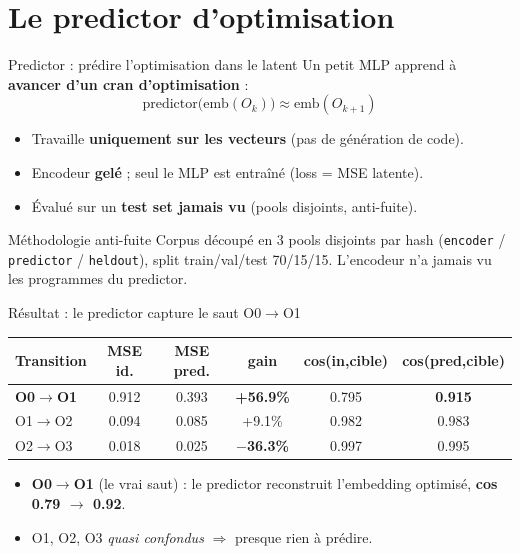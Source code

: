 \documentclass[aspectratio=169,11pt]{beamer}
\newcommand{\hl}[1]{\textcolor{jblue}{\textbf{#1}}}
\newcommand{\good}[1]{\textcolor{jgreen}{\textbf{#1}}}
\newcommand{\bad}[1]{\textcolor{jred}{\textbf{#1}}}
\begin{document}
\section{Le predictor d'optimisation}
\begin{frame}{Predictor : prédire l'optimisation dans le latent}
  Un petit MLP apprend à \hl{avancer d'un cran d'optimisation} :
  \[ \text{predictor}\big(\text{emb}(O_k)\big) \approx \text{emb}(O_{k+1}) \]
  \begin{itemize}
    \item Travaille \textbf{uniquement sur les vecteurs} (pas de génération de code).
    \item Encodeur \textbf{gelé} ; seul le MLP est entraîné (loss = MSE latente).
    \item Évalué sur un \hl{test set jamais vu} (pools disjoints, anti-fuite).
  \end{itemize}
  \vspace{2mm}
  \begin{block}{Méthodologie anti-fuite}
    \footnotesize Corpus découpé en 3 pools disjoints par hash
    (\texttt{encoder} / \texttt{predictor} / \texttt{heldout}), split
    train/val/test 70/15/15. L'encodeur n'a jamais vu les programmes du predictor.
  \end{block}
\end{frame}

\begin{frame}{Résultat : le predictor capture le saut O0$\to$O1}
  \centering
  \small
  \begin{tabular}{lccccc}
    \toprule
    Transition & MSE id. & MSE pred. & gain & cos(in,cible) & cos(pred,cible) \\
    \midrule
    \textbf{O0$\to$O1} & 0.912 & 0.393 & \good{+56.9\%} & 0.795 & \good{0.915} \\
    O1$\to$O2 & 0.094 & 0.085 & +9.1\% & 0.982 & 0.983 \\
    O2$\to$O3 & 0.018 & 0.025 & \bad{$-$36.3\%} & 0.997 & 0.995 \\
    \bottomrule
  \end{tabular}
  \vspace{4mm}
  \begin{itemize}\small
    \item \good{O0$\to$O1} (le vrai saut) : le predictor reconstruit l'embedding
          optimisé, \hl{cos 0.79 $\to$ 0.92}.
    \item O1, O2, O3 \emph{quasi confondus} $\Rightarrow$ presque rien à prédire.
  \end{itemize}
\end{frame}
\end{document}
